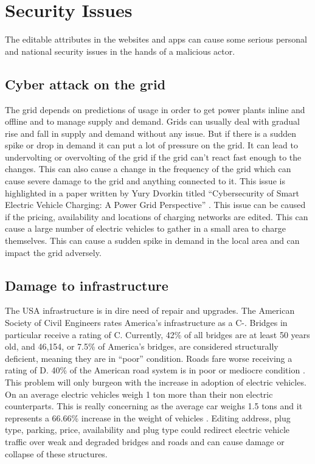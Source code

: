 \documentclass[conference]{IEEEtran}
\begin{document}
\section{Security Issues}
The editable attributes in the websites and apps can cause some serious personal and national security issues in the hands of a malicious actor.

\subsection{Cyber attack on the grid}
The grid depends on predictions of usage in order to get power plants inline and offline and to manage supply and demand. Grids can usually deal with gradual rise and fall in supply and demand without any issue. But if there is a sudden spike or drop in demand it can put a lot of pressure on the grid. It can lead to undervolting or overvolting of the grid if the grid can’t react fast enough to the changes. This can also cause a change in the frequency of the grid which can cause severe damage to the grid and anything connected to it. This issue is highlighted in a paper written by Yury Dvorkin titled “Cybersecurity of Smart Electric Vehicle Charging: A Power Grid Perspective” \cite{b2}. This issue can be caused if the pricing, availability and locations of charging networks are edited. This can cause a large number of electric vehicles to gather in a small area to charge themselves. This can cause a sudden spike in demand in the local area and can impact the grid adversely.

\subsection{Damage to infrastructure}
The USA infrastructure is in dire need of repair and upgrades. The American Society of Civil Engineers rates America’s infrastructure as a C-. Bridges in particular receive a rating of C. Currently, 42\% of all bridges are at least 50 years old, and 46,154, or 7.5\% of America's bridges, are considered structurally deficient, meaning they are in “poor” condition. Roads fare worse receiving a rating of D. 40\% of the American road system is in poor or mediocre condition \cite{b3}. This problem will only burgeon with the increase in adoption of electric vehicles. On an average electric vehicles weigh 1 ton more than their non electric counterparts. This is really concerning as the average car weighs 1.5 tons and it represents a 66.66\% increase in the weight of vehicles \cite{b4}. Editing address, plug type, parking, price, availability and plug type could redirect electric vehicle traffic over weak and degraded bridges and roads and can cause damage or collapse of these structures.
\end{document}

